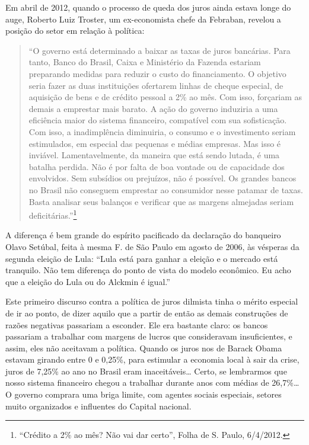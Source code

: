 Em abril de 2012, quando o processo de queda dos juros ainda estava
longe do auge, Roberto Luiz Troster, um ex-economista chefe da Febraban,
revelou a posição do setor em relação à política:

\begin{quote}
``O governo está determinado a baixar as taxas de juros bancárias. Para
tanto, Banco do Brasil, Caixa e Ministério da Fazenda estariam
preparando medidas para reduzir o custo do financiamento. O objetivo
seria fazer as duas instituições ofertarem linhas de cheque especial, de
aquisição de bens e de crédito pessoal a 2\% ao mês. Com isso, forçariam
as demais a emprestar mais barato. A ação do governo induziria a uma
eficiência maior do sistema financeiro, compatível com sua sofisticação.
Com isso, a inadimplência diminuiria, o consumo e o investimento seriam
estimulados, em especial das pequenas e médias empresas. Mas isso é
inviável. Lamentavelmente, da maneira que está sendo lutada, é uma
batalha perdida. Não é por falta de boa vontade ou de capacidade dos
envolvidos. Sem subsídios ou prejuízos, não é possível. Os grandes
bancos no Brasil não conseguem emprestar ao consumidor nesse patamar de
taxas. Basta analisar seus balanços e verificar que as margens almejadas
seriam deficitárias.''\footnote{``Crédito a 2\% ao mês? Não vai dar
  certo'', Folha de S. Paulo, 6/4/2012.}
\end{quote}

A diferença é bem grande do espírito pacificado da declaração do
banqueiro Olavo Setúbal, feita à mesma F. de São Paulo em agosto de
2006, às vésperas da segunda eleição de Lula: ``Lula está para ganhar a
eleição e o mercado está tranquilo. Não tem diferença do ponto de vista
do modelo econômico. Eu acho que a eleição do Lula ou do Alckmin é
igual.''

Este primeiro discurso contra a política de juros dilmista tinha o
mérito especial de ir ao ponto, de dizer aquilo que a partir de então as
demais construções de razões negativas passariam a esconder. Ele era
bastante claro: os bancos passariam a trabalhar com margens de lucros
que consideravam insuficientes, e assim, eles não aceitavam a política.
Quando os juros nos  de Barack Obama estavam girando entre 0 e
0,25\%, para estimular a economia local à sair da crise, juros de 7,25\%
ao ano no Brasil eram inaceitáveis… Certo, se lembrarmos que nosso
sistema financeiro chegou a trabalhar durante anos com médias de
26,7\%… O governo comprara uma briga limite, com agentes sociais
especiais, setores muito organizados e influentes do Capital nacional.

